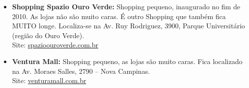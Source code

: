 \begin{itemize}
\item \textbf{Shopping Spazio Ouro Verde:} Shopping peque\-no, inaugurado no
  fim de 2010. As lojas não são muito caras. É outro Shopping que também fica
  MUITO longe. Localiza-se na Av. Ruy Rodriguez, 3900, Parque Universitário
  (região do Ouro Verde).
  \\Site: \url{spazioouroverde.com.br}

\item \textbf{Ventura Mall:} Shopping pequeno, as lojas são muito caras. Fica
  localizado na Av. Moraes Salles, 2790 -- Nova Campinas.
  \\Site: \url{venturamall.com.br}
\end{itemize}
